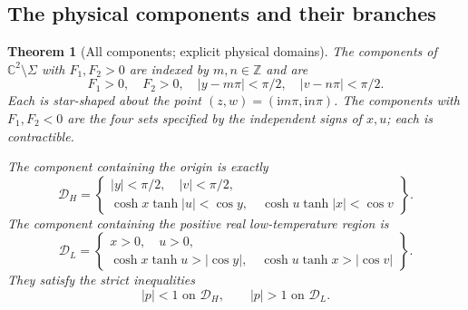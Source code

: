 \documentclass[11pt]{article}
\numberwithin{equation}{section}
\newtheorem{theorem}{Theorem}[section]
\theoremstyle{definition}
\newcommand{\C}{\mathbb C}
\newcommand{\Z}{\mathbb Z}
\newcommand{\ii}{\mathrm i}
\renewcommand{\DH}{\mathcal D_H}
\newcommand{\DL}{\mathcal D_L}
\begin{document}
\subsection{The physical components and their branches}
\label{geo:components-section}

\begin{theorem}[All components; explicit physical domains]
\label{geo:components}
The components of \(\C^2\setminus\Sigma\) with \(F_1,F_2>0\)
are indexed by \(m,n\in\Z\) and are
\[
 F_1>0,\quad F_2>0,\quad
 |y-m\pi|<\pi/2,\quad |v-n\pi|<\pi/2.
\]
Each is star-shaped about the point
\((z,w)=(\ii m\pi,\ii n\pi)\).
The components with \(F_1,F_2<0\) are the four sets specified
by the independent signs of \(x,u\); each is contractible.

The component containing the origin is exactly
\begin{equation}\label{geo:DH}
 \DH=\left\{
 \begin{array}{l}
 |y|<\pi/2,\quad |v|<\pi/2,\\
 \cosh x\tanh|u|<\cos y,\quad
 \cosh u\tanh|x|<\cos v
 \end{array}\right\}.
\end{equation}
The component containing the positive real low-temperature region is
\begin{equation}\label{geo:DL}
 \DL=\left\{
 \begin{array}{l}
 x>0,\quad u>0,\\
 \cosh x\tanh u>|\cos y|,\quad
 \cosh u\tanh x>|\cos v|
 \end{array}\right\}.
\end{equation}
They satisfy the strict inequalities
\begin{equation}\label{geo:p-domains}
                         |p|<1\text{ on }\DH,\qquad
                         |p|>1\text{ on }\DL.
\end{equation}
\end{theorem}
\end{document}
